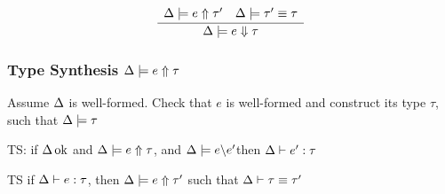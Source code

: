 \documentclass[12pt,twoside,fleqn]{amsart}
\theoremstyle{plain}
\theoremstyle{plain}
\theoremstyle{definition}
\begin{document}
\[
\frac{\begin{array}{ll}
\Delta  \models e  \Uparrow \tau '  & \Delta  \models \tau '  \equiv \tau  
\end{array} }{\Delta  \models e \Downarrow \tau  }\]



\subsubsection{Type Synthesis \protect\( \Delta  \models e  \Uparrow \tau  \protect \)}

Assume \( \Delta  \) is well-formed. Check that \( e \) is well-formed and
construct its type \( \tau  \), such that \( \Delta  \models \tau   \)

TS: if \( \Delta  \, \mathrm{ok} \) and \( \Delta  \models e  \Uparrow \tau   \), and \( \Delta  \models e \backslash e' \)then
\( \Delta  \vdash e'  :\tau   \) 

TS if \( \Delta  \vdash e  :\tau   \), then \( \Delta  \models e  \Uparrow \tau '  \) such that \( \Delta  \vdash \tau  \equiv \tau ' \)
\end{document}
